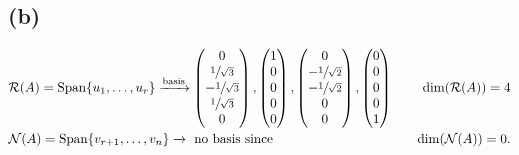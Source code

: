 \documentclass[12pt]{article}
\begin{document}
		\subsection*{(b)}
			\begin{align*}
				&\mathcal{R} (A) = \text{Span}\{u_{1} , \dots , u_{r}\} \xrightarrow{\text{basis}}
				\begin{pmatrix}
					0 \\ \sfrac{1}{\sqrt{3}} \\ -\sfrac{1}{\sqrt{3}} \\ \sfrac{1}{\sqrt{3}} \\ 0 
				\end{pmatrix} , 
				\begin{pmatrix}
					1 \\ 0 \\ 0 \\ 0 \\ 0 
				\end{pmatrix} , 
				\begin{pmatrix}
					0 \\ -\sfrac{1}{\sqrt{2}} \\ -\sfrac{1}{\sqrt{2}} \\ 0 \\ 0 
				\end{pmatrix} , 
				\begin{pmatrix}
					0 \\ 0 \\ 0 \\ 0 \\ 1
				\end{pmatrix}
				\quad &\dim(\mathcal{R}(A)) = 4 \\
				&\mathcal{N}(A) = \text{Span}\{v_{r+1} , \dots , v_{n}\} \xrightarrow{}{} \ \text{no basis since } &\dim(\mathcal{N}(A)) = 0.
			\end{align*}
\end{document}
